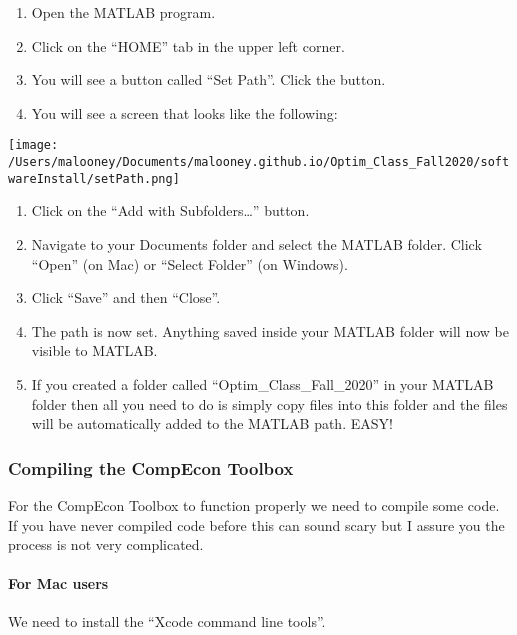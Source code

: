 \documentclass[
]{article}
\begin{document}
\begin{enumerate}
\def\labelenumi{\arabic{enumi}.}
\item
  Open the MATLAB program.
\item
  Click on the ``HOME'' tab in the upper left corner.
\item
  You will see a button called ``Set Path''. Click the button.
\item
  You will see a screen that looks like the following:
\end{enumerate}

\texttt{[image: /Users/malooney/Documents/malooney.github.io/Optim\_Class\_Fall2020/softwareInstall/setPath.png]}

\begin{enumerate}
\def\labelenumi{\arabic{enumi}.}
\setcounter{enumi}{4}
\item
  Click on the ``Add with Subfolders\ldots{}'' button.
\item
  Navigate to your Documents folder and select the MATLAB folder. Click
  ``Open'' (on Mac) or ``Select Folder'' (on Windows).
\item
  Click ``Save'' and then ``Close''.
\item
  The path is now set. Anything saved inside your MATLAB folder will now
  be visible to MATLAB.
\item
  If you created a folder called ``Optim\_Class\_Fall\_2020'' in your
  MATLAB folder then all you need to do is simply copy files into this
  folder and the files will be automatically added to the MATLAB path.
  EASY!
\end{enumerate}

\hypertarget{compiling-the-compecon-toolbox}{%
\subsubsection{Compiling the CompEcon
Toolbox}\label{compiling-the-compecon-toolbox}}

For the CompEcon Toolbox to function properly we need to compile some
code. If you have never compiled code before this can sound scary but I
assure you the process is not very complicated.

\hypertarget{for-mac-users}{%
\paragraph{For Mac users}\label{for-mac-users}}

We need to install the ``Xcode command line tools''.
\end{document}
